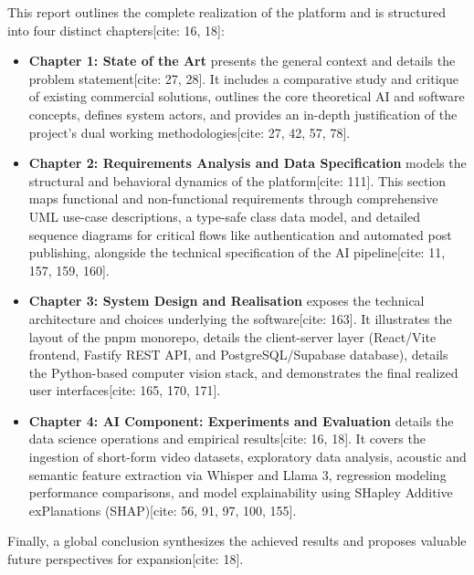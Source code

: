 \noindent This report outlines the complete realization of the platform and is structured into four distinct chapters[cite: 16, 18]:
\begin{itemize}
    \item \textbf{Chapter 1: State of the Art} presents the general context and details the problem statement[cite: 27, 28]. It includes a comparative study and critique of existing commercial solutions, outlines the core theoretical AI and software concepts, defines system actors, and provides an in-depth justification of the project's dual working methodologies[cite: 27, 42, 57, 78].
    \item \textbf{Chapter 2: Requirements Analysis and Data Specification} models the structural and behavioral dynamics of the platform[cite: 111]. This section maps functional and non-functional requirements through comprehensive UML use-case descriptions, a type-safe class data model, and detailed sequence diagrams for critical flows like authentication and automated post publishing, alongside the technical specification of the AI pipeline[cite: 11, 157, 159, 160].
    \item \textbf{Chapter 3: System Design and Realisation} exposes the technical architecture and choices underlying the software[cite: 163]. It illustrates the layout of the pnpm monorepo, details the client-server layer (React/Vite frontend, Fastify REST API, and PostgreSQL/Supabase database), details the Python-based computer vision stack, and demonstrates the final realized user interfaces[cite: 165, 170, 171].
    \item \textbf{Chapter 4: AI Component: Experiments and Evaluation} details the data science operations and empirical results[cite: 16, 18]. It covers the ingestion of short-form video datasets, exploratory data analysis, acoustic and semantic feature extraction via Whisper and Llama 3, regression modeling performance comparisons, and model explainability using SHapley Additive exPlanations (SHAP)[cite: 56, 91, 97, 100, 155].
\end{itemize}
Finally, a global conclusion synthesizes the achieved results and proposes valuable future perspectives for expansion[cite: 18].